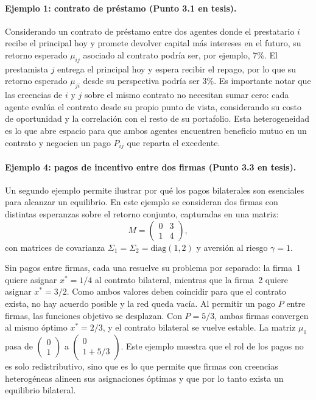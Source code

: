 \documentclass[12pt,a4paper]{article}
\begin{document}
\paragraph{Ejemplo 1: contrato de préstamo (Punto 3.1 en tesis).}
Considerando un contrato de préstamo entre dos agentes donde el prestatario $i$ recibe el
principal hoy y promete devolver capital más intereses en el futuro, su retorno esperado
$\mu_{ij}$ asociado al contrato podría ser, por ejemplo, 7\%. El prestamista $j$ entrega el
principal hoy y espera recibir el repago, por lo que su retorno esperado $\mu_{ji}$ desde su
perspectiva podría ser 3\%. Es importante notar que las creencias de $i$ y $j$ sobre el mismo
contrato no necesitan sumar cero: cada agente evalúa el contrato desde su propio punto de
vista, considerando su costo de oportunidad y la correlación con el resto de su portafolio. Esta
heterogeneidad es lo que abre espacio para que ambos agentes encuentren beneficio mutuo en
un contrato y negocien un pago $P_{ij}$ que reparta el excedente.

\paragraph{Ejemplo 4: pagos de incentivo entre dos firmas (Punto 3.3 en tesis).}
Un segundo ejemplo permite ilustrar por qué los pagos bilaterales son esenciales para alcanzar
un equilibrio. En este ejemplo se consideran dos firmas con distintas esperanzas sobre el
retorno conjunto, capturadas en una matriz:
\begin{equation}
    M = \begin{pmatrix} 0 & 3 \\ 1 & 4 \end{pmatrix},
\end{equation}
con matrices de covarianza $\Sigma_1 = \Sigma_2 = \mathrm{diag}(1, 2)$ y aversión al riesgo
$\gamma = 1$.

Sin pagos entre firmas, cada una resuelve su problema por separado: la firma~1 quiere asignar
$x^* = 1/4$ al contrato bilateral, mientras que la firma~2 quiere asignar $x^* = 3/2$. Como ambos
valores deben coincidir para que el contrato exista, no hay acuerdo posible y la red queda vacía.
Al permitir un pago $P$ entre firmas, las funciones objetivo se desplazan. Con $P = 5/3$, ambas
firmas convergen al mismo óptimo $x^* = 2/3$, y el contrato bilateral se vuelve estable. La
matriz $\mu_1$ pasa de $\begin{pmatrix}0\\1\end{pmatrix}$ a $\begin{pmatrix}0\\1+5/3\end{pmatrix}$.
Este ejemplo muestra que el rol de los pagos no es solo redistributivo, sino que es lo que
permite que firmas con creencias heterogéneas alineen sus asignaciones óptimas y que por lo
tanto exista un equilibrio bilateral.
\end{document}
